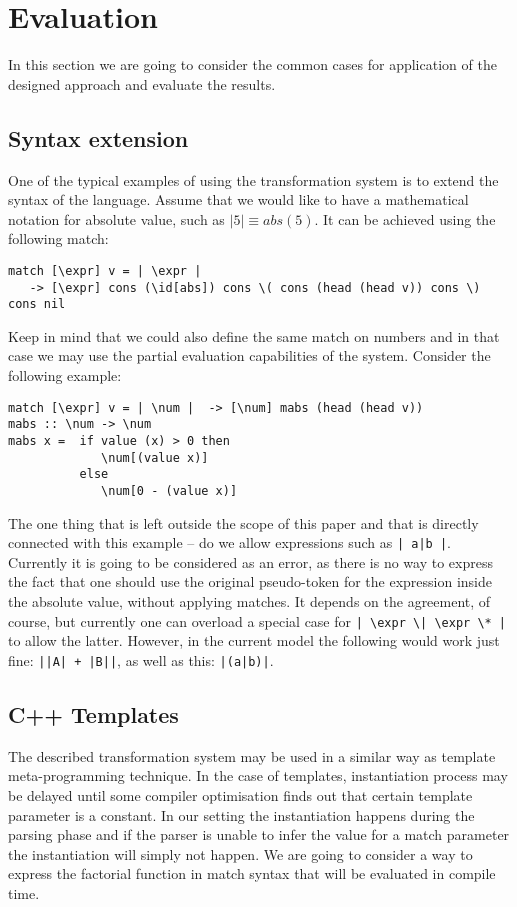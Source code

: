 \section{Evaluation}

In this section we are going to consider the common cases for
application of the designed approach and evaluate the results.

\subsection{Syntax extension}

One of the typical examples of using the transformation system is to 
extend the
syntax of the language.  Assume that we would like to have a mathematical 
notation for absolute value, such as $\left|5\right| \equiv abs(5)$. 
It can be achieved using the following match:
\begin{verbatim}
match [\expr] v = | \expr | 
   -> [\expr] cons (\id[abs]) cons \( cons (head (head v)) cons \) cons nil
\end{verbatim}

Keep in mind that we could also define the same match on numbers
and in that case we may use the partial evaluation capabilities of 
the system.  Consider the following example:
\begin{verbatim}
match [\expr] v = | \num |  -> [\num] mabs (head (head v))
mabs :: \num -> \num
mabs x =  if value (x) > 0 then
             \num[(value x)]
          else
             \num[0 - (value x)]
\end{verbatim}

The one thing that is left outside the scope of this paper and that 
is directly connected with this example -- do we allow expressions such as
\verb/| a|b |/.  Currently it is going to be considered as an error, as there is
no way to express the fact that one should use the original pseudo-token
for the expression inside the absolute value,
without applying matches.  It depends on the agreement, of course,
but currently one can overload a special case for 
\verb/| \expr \| \expr \* |/ to allow the latter.  However, in the
current model the following would work just fine: \verb/||A| + |B||/, 
as well as this: \verb/|(a|b)|/.

\subsection{C++ Templates}

The described transformation system may be used in a similar way as template
meta-programming technique.  In the case of templates, instantiation process
may be delayed until some compiler optimisation finds out that certain template
parameter is a constant.  In our setting the instantiation happens during the
parsing phase and if the parser is unable to infer the value for a match
parameter the instantiation will simply not happen.  We are going to consider a
way to express the factorial function in match syntax that will be evaluated in
compile time.

